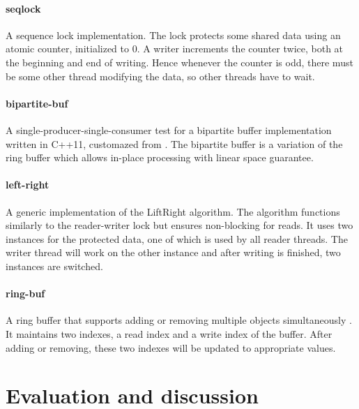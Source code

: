 \paragraph{seqlock} A sequence lock implementation. The lock protects some shared data using an atomic counter, initialized to 0. A writer increments the counter twice, both at the beginning and end of writing. Hence whenever the counter is odd, there must be some other thread modifying the data, so other threads have to wait.

\paragraph{bipartite-buf} A single-producer-single-consumer test for a bipartite buffer implementation written in C++11, customazed from \cite{lockfree-DNedic}. The bipartite buffer is a variation of the ring buffer which allows in-place processing with linear space guarantee.

\paragraph{left-right} A generic implementation \cite{lockfree-xenium} of the LiftRight algorithm\cite{left-right}. The algorithm functions similarly to the reader-writer lock but ensures non-blocking for reads. It uses two instances for the protected data, one of which is used by all reader threads. The writer thread will work on the other instance and after writing is finished, two instances are switched.


\paragraph{ring-buf} A ring buffer that supports adding or removing multiple objects simultaneously \cite{lockfree-DNedic}. It maintains two indexes, a read index and a write index of the buffer. After adding or removing, these two indexes will be updated to appropriate values.



\section{Evaluation and discussion}




